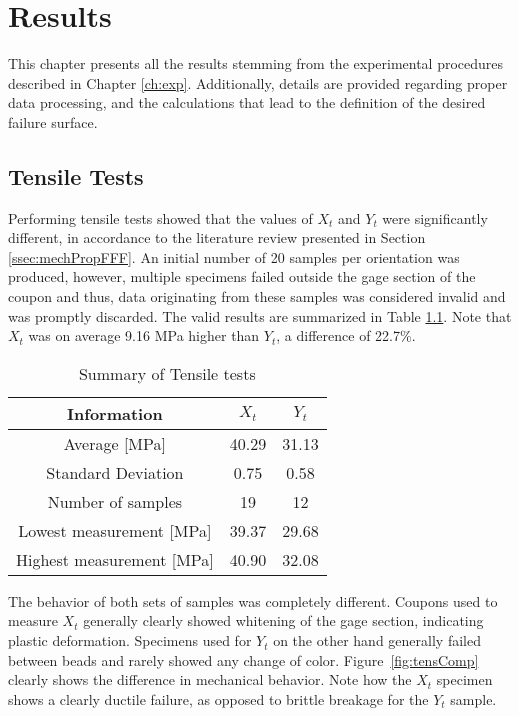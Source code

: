\documentclass[main.tex]{subfiles}
\begin{document}
\chapter{Results} \label{ch:res}

This chapter presents all the results stemming from the experimental procedures described in Chapter \ref{ch:exp}. Additionally, details are provided regarding proper data processing, and the calculations that lead to the definition of the desired failure surface. 

\section{Tensile Tests} \label{sec:tensr}
Performing tensile tests showed that the values of $X_t$ and $Y_t$ were significantly different, in accordance to the literature review presented in Section \ref{ssec:mechPropFFF}. An initial number of 20 samples per orientation was produced, however, multiple specimens failed outside the gage section of the coupon and thus, data originating from these samples was considered invalid and was promptly discarded. The valid results are summarized in Table \ref{tab:tensrtab}. Note that $X_t$ was on average 9.16 MPa higher than $Y_t$, a difference of 22.7\%.
\begin{table} [h]
	\centering
	\caption{Summary of Tensile tests}
\begin{tabular}{ c| c c } 
	\toprule
	\textbf{Information} & $X_t$ & $Y_t$\\
	\midrule
	Average [MPa] & 40.29 & 31.13\\
	Standard Deviation & 0.75 & 0.58\\
	Number of samples & 19 & 12\\
	Lowest measurement [MPa] &39.37  & 29.68\\
	Highest measurement [MPa] &40.90 & 32.08\\
	\bottomrule
\end{tabular}
\label{tab:tensrtab}
\end{table}

The behavior of both sets of samples was completely different. Coupons used to measure $X_t$ generally clearly showed whitening of the gage section, indicating plastic deformation. Specimens used for $Y_t$ on the other hand generally failed between beads and rarely showed any change of color. Figure~\ref{fig:tensComp} clearly shows the difference in mechanical behavior. Note how the $X_t$ specimen shows a clearly ductile failure, as opposed to brittle breakage for the $Y_t$ sample.
\pagebreak
\end{document}
